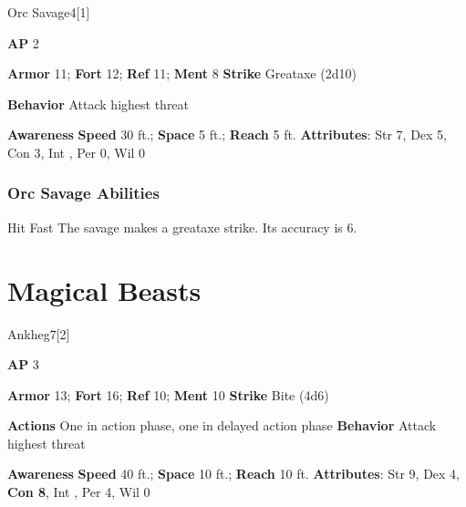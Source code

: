 \begin{monsection}{Orc Savage}{4}[1]
\vspace{-1em}\vspace{-1em}
\begin{spellcontent}
\begin{spelltargetinginfo}
{\textbf{AP} 2}

\pari \textbf{Armor} 11;
\textbf{Fort} 12;
\textbf{Ref} 11;
\textbf{Ment} 8
\pari \textbf{Strike} Greataxe  (2d10)



\pari \textbf{Behavior} Attack highest threat
\end{spelltargetinginfo}
\end{spellcontent}

\begin{monsterfooter}
\pari \textbf{Awareness} 
\pari \textbf{Speed} 30 ft.;
\textbf{Space} 5 ft.;
\textbf{Reach} 5 ft.
\pari \textbf{Attributes}:
Str 7,
Dex 5,
Con 3,
Int ,
Per 0,
Wil 0
\end{monsterfooter}
\end{monsection}


\subsubsection{Orc Savage Abilities}

\begin{ability}{Hit Fast}
The savage makes a greataxe strike.
Its accuracy is 6.
\end{ability}





\section{Magical Beasts}

\begin{monsection}{Ankheg}{7}[2]
\vspace{-1em}\vspace{-1em}
\begin{spellcontent}
\begin{spelltargetinginfo}
{\textbf{AP} 3}

\pari \textbf{Armor} 13;
\textbf{Fort} 16;
\textbf{Ref} 10;
\textbf{Ment} 10
\pari \textbf{Strike} Bite  (4d6)


\pari \textbf{Actions} One in action phase, one in delayed action phase
\pari \textbf{Behavior} Attack highest threat
\end{spelltargetinginfo}
\end{spellcontent}

\begin{monsterfooter}
\pari \textbf{Awareness} 
\pari \textbf{Speed} 40 ft.;
\textbf{Space} 10 ft.;
\textbf{Reach} 10 ft.
\pari \textbf{Attributes}:
Str 9,
Dex 4,
\textbf{Con 8},
Int ,
Per 4,
Wil 0
\end{monsterfooter}
\end{monsection}


